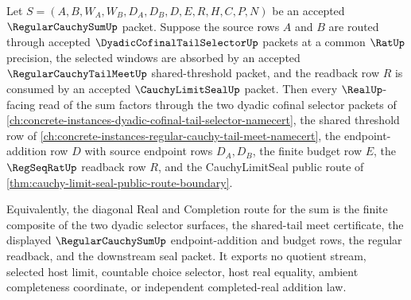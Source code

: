 \begin{theorem}
\label{thm:regular-cauchy-sum-dyadic-cofinal-selector-handoff}
Let $S=(A,B,W_A,W_B,D_A,D_B,D,E,R,H,C,P,N)$ be an accepted $\RegularCauchySumUp$ packet. Suppose the source rows $A$ and $B$ are routed through accepted $\DyadicCofinalTailSelectorUp$ packets at a common $\RatUp$ precision, the selected windows are absorbed by an accepted $\RegularCauchyTailMeetUp$ shared-threshold packet, and the readback row $R$ is consumed by an accepted $\CauchyLimitSealUp$ packet. Then every $\RealUp$-facing read of the sum factors through the two dyadic cofinal selector packets of \autoref{ch:concrete-instances-dyadic-cofinal-tail-selector-namecert}, the shared threshold row of \autoref{ch:concrete-instances-regular-cauchy-tail-meet-namecert}, the endpoint-addition row $D$ with source endpoint rows $D_A,D_B$, the finite budget row $E$, the $\RegSeqRatUp$ readback row $R$, and the CauchyLimitSeal public route of \autoref{thm:cauchy-limit-seal-public-route-boundary}.

Equivalently, the diagonal Real and Completion route for the sum is the finite composite of the two dyadic selector surfaces, the shared-tail meet certificate, the displayed $\RegularCauchySumUp$ endpoint-addition and budget rows, the regular readback, and the downstream seal packet. It exports no quotient stream, selected host limit, countable choice selector, host real equality, ambient completeness coordinate, or independent completed-real addition law.
\end{theorem}
